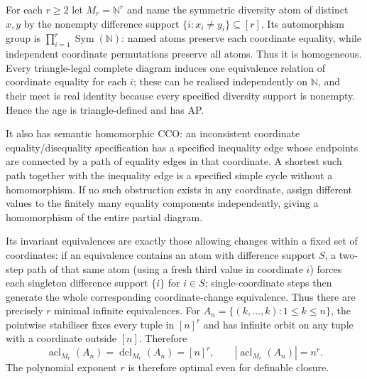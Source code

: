 \begin{example}
\label{ex:rh-acl-polynomial-sharp}
For each $r\ge2$ let $M_r=\mathbb N^r$ and name the symmetric
diversity atom of distinct $x,y$ by the nonempty difference
support $\{i:x_i\ne y_i\}\subseteq[r]$.  Its automorphism group
is $\prod_{i=1}^r\operatorname{Sym}(\mathbb N)$: named atoms
preserve each coordinate equality, while independent coordinate
permutations preserve all atoms.  Thus it is homogeneous.
Every triangle-legal complete diagram induces one equivalence
relation of coordinate equality for each $i$; these can be
realised independently on $\mathbb N$, and their meet is real
identity because every specified diversity support is nonempty.
Hence the age is triangle-defined and has AP.

It also has semantic homomorphic CCO: an inconsistent
coordinate equality/disequality specification has a specified
inequality edge whose endpoints are connected by a path
of equality edges in that coordinate.  A shortest such path
together with the inequality edge is a specified simple
cycle without a homomorphism.  If no such obstruction exists
in any coordinate, assign different values to the finitely many
equality components independently, giving a homomorphism of
the entire partial diagram.

Its invariant equivalences are exactly those allowing changes
within a fixed set of coordinates: if an equivalence contains
an atom with difference support $S$, a two-step path of that
same atom (using a fresh third value in coordinate $i$)
forces each singleton difference support $\{i\}$ for $i\in S$;
single-coordinate steps then generate the whole corresponding
coordinate-change equivalence.  Thus there are precisely $r$
minimal infinite equivalences.  For
$A_n=\{(k,\ldots,k):1\le k\le n\}$, the pointwise stabiliser fixes
every tuple in $[n]^r$ and has infinite orbit on any tuple
with a coordinate outside $[n]$.  Therefore
\[
 \operatorname{acl}_{M_r}(A_n)
 =\operatorname{dcl}_{M_r}(A_n)=[n]^r,\qquad
 |\operatorname{acl}_{M_r}(A_n)|=n^r.
\]
The polynomial exponent $r$ is therefore optimal even
for definable closure.
\end{example}


